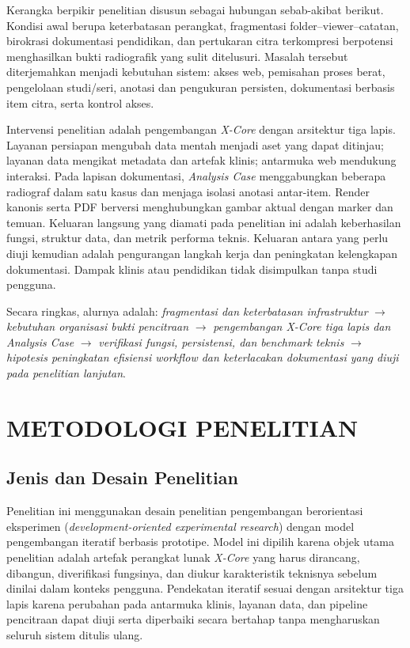\documentclass[12pt,a4paper,oneside]{report}
\newcommand{\xcore}{\textit{X-Core}}
\begin{document}
Kerangka berpikir penelitian disusun sebagai hubungan sebab-akibat berikut. Kondisi awal berupa keterbatasan perangkat, fragmentasi folder--viewer--catatan, birokrasi dokumentasi pendidikan, dan pertukaran citra terkompresi berpotensi menghasilkan bukti radiografik yang sulit ditelusuri. Masalah tersebut diterjemahkan menjadi kebutuhan sistem: akses web, pemisahan proses berat, pengelolaan studi/seri, anotasi dan pengukuran persisten, dokumentasi berbasis item citra, serta kontrol akses.

Intervensi penelitian adalah pengembangan \xcore{} dengan arsitektur tiga lapis. Layanan persiapan mengubah data mentah menjadi aset yang dapat ditinjau; layanan data mengikat metadata dan artefak klinis; antarmuka web mendukung interaksi. Pada lapisan dokumentasi, \textit{Analysis Case} menggabungkan beberapa radiograf dalam satu kasus dan menjaga isolasi anotasi antar-item. Render kanonis serta PDF berversi menghubungkan gambar aktual dengan marker dan temuan. Keluaran langsung yang diamati pada penelitian ini adalah keberhasilan fungsi, struktur data, dan metrik performa teknis. Keluaran antara yang perlu diuji kemudian adalah pengurangan langkah kerja dan peningkatan kelengkapan dokumentasi. Dampak klinis atau pendidikan tidak disimpulkan tanpa studi pengguna.

Secara ringkas, alurnya adalah: \textit{fragmentasi dan keterbatasan infrastruktur} $\rightarrow$ \textit{kebutuhan organisasi bukti pencitraan} $\rightarrow$ \textit{pengembangan X-Core tiga lapis dan Analysis Case} $\rightarrow$ \textit{verifikasi fungsi, persistensi, dan benchmark teknis} $\rightarrow$ \textit{hipotesis peningkatan efisiensi workflow dan keterlacakan dokumentasi yang diuji pada penelitian lanjutan}.

\chapter{METODOLOGI PENELITIAN}
\label{bab:metodologi}

\section{Jenis dan Desain Penelitian}

Penelitian ini menggunakan desain penelitian pengembangan berorientasi eksperimen (\textit{development-oriented experimental research}) dengan model pengembangan iteratif berbasis prototipe. Model ini dipilih karena objek utama penelitian adalah artefak perangkat lunak \xcore{} yang harus dirancang, dibangun, diverifikasi fungsinya, dan diukur karakteristik teknisnya sebelum dinilai dalam konteks pengguna. Pendekatan iteratif sesuai dengan arsitektur tiga lapis karena perubahan pada antarmuka klinis, layanan data, dan pipeline pencitraan dapat diuji serta diperbaiki secara bertahap tanpa mengharuskan seluruh sistem ditulis ulang.
\end{document}
